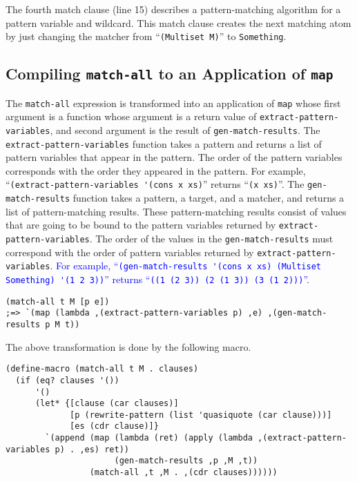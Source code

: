 \documentclass[acmlarge]{acmart}
\newcommand{\new}[1]{\textcolor{blue}{#1}}
\begin{document}
The fourth match clause (line 15) describes a pattern-matching algorithm for a pattern variable and wildcard.
This match clause creates the next matching atom by just changing the matcher from ``\lstinline{(Multiset M)}'' to \lstinline{Something}.

\subsection{Compiling \lstinline{match-all} to an Application of \lstinline{map}}\label{method-map}

The \lstinline{match-all} expression is transformed into an application of \lstinline{map} whose first argument is a function whose argument is a return value of \lstinline{extract-pattern-variables}, and second argument is the result of \lstinline{gen-match-results}.
The \lstinline{extract-pattern-variables} function takes a pattern and returns a list of pattern variables that appear in the pattern.
The order of the pattern variables corresponds with the order they appeared in the pattern.
For example, ``\lstinline{(extract-pattern-variables '(cons x xs)}'' returns ``\lstinline{(x xs)}''.
The \lstinline{gen-match-results} function takes a pattern, a target, and a matcher, and returns a list of pattern-matching results.
These pattern-matching results consist of values that are going to be bound to the pattern variables returned by \lstinline{extract-pattern-variables}.
The order of the values in the \lstinline{gen-match-results} must correspond with the order of pattern variables returned by \lstinline{extract-pattern-variables}.
\new{
For example, ``\lstinline{(gen-match-results '(cons x xs) (Multiset Something) '(1 2 3))}'' returns ``\lstinline{((1 (2 3)) (2 (1 3)) (3 (1 2)))}''.
}%

\begin{lstlisting}[language=egison]
(match-all t M [p e])
;=> `(map (lambda ,(extract-pattern-variables p) ,e) ,(gen-match-results p M t))
\end{lstlisting}

\noindent The above transformation is done by the following macro.

\begin{lstlisting}[language=egison]
(define-macro (match-all t M . clauses)
  (if (eq? clauses '())
      '()
      (let* {[clause (car clauses)]
             [p (rewrite-pattern (list 'quasiquote (car clause)))]
             [es (cdr clause)]}
        `(append (map (lambda (ret) (apply (lambda ,(extract-pattern-variables p) . ,es) ret))
                      (gen-match-results ,p ,M ,t))
                 (match-all ,t ,M . ,(cdr clauses))))))
\end{lstlisting}
\end{document}
